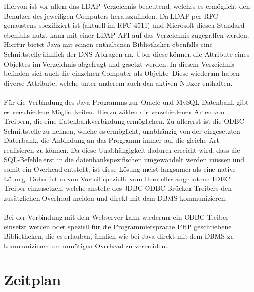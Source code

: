 Hiervon ist vor allem das LDAP-Verzeichnis bedeutend, welches es ermöglicht den Benutzer des jeweiligen Computers herauszufinden.
Da LDAP per RFC genaustens spezifiziert ist (aktuell im RFC 4511) und Microsoft diesen Standard ebenfalls nutzt kann mit einer LDAP-API auf das Verzeichnis zugegriffen werden.
Hierfür bietet Java mit seinen enthaltenen Bibliotheken ebenfalls eine Schnittstelle ähnlich der DNS-Abfragen an. Über diese können die Attribute eines Objektes im Verzeichnis abgefragt und gesetzt werden. In diesem Verzeichnis befinden sich auch die einzelnen Computer als Objekte. Diese wiederum haben diverse Attribute, welche unter anderem auch den aktiven Nutzer enthalten.\\\\
Für die Verbindung des Java-Programms zur Oracle und MySQL-Datenbank gibt es verschiedene Möglichkeiten. Hierzu zählen die verschiedenen Arten von Treibern, die eine Datenbankverbindung ermöglichen. Zu allererst ist die ODBC-Schnittstelle zu nennen, welche es ermöglicht, unabhängig von der eingesetzten Datenbank, die Anbindung an das Programm immer auf die gleiche Art realisieren zu können.
Da diese Unabhängigkeit dadurch erreicht wird, dass die SQL-Befehle erst in die datenbankspezifischen umgewandelt werden müssen und somit ein Overhead entsteht, ist diese Lösung meist langsamer als eine native Lösung. Daher ist es von Vorteil spezielle vom Hersteller angebotene JDBC-Treiber einzusetzen, welche anstelle des JDBC-ODBC Brücken-Treibers den zusätzlichen Overhead meiden und direkt mit dem DBMS kommunizieren.\\\\
Bei der Verbindung mit dem Webserver kann wiederum ein ODBC-Treiber einsetzt werden oder speziell für die Programmiersprache PHP geschriebene Bibliotheken, die es erlauben, ähnlich wie bei Java direkt mit dem DBMS zu kommunizieren um unnötigen Overhead zu vermeiden.

\section{Zeitplan}
\label{sec:timetable}


